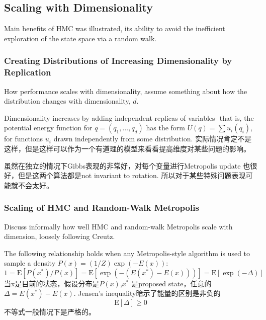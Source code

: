 \documentclass[
]{book}
\theoremstyle{definition}
\theoremstyle{definition}
\theoremstyle{definition}
\theoremstyle{remark}
\begin{document}
\hypertarget{scaling-with-dimensionality}{%
\subsection{Scaling with Dimensionality}\label{scaling-with-dimensionality}}

Main benefits of HMC was illustrated, its ability to avoid the inefficient exploration of the state space via a random walk.

\hypertarget{creating-distributions-of-increasing-dimensionality-by-replication}{%
\subsubsection{Creating Distributions of Increasing Dimensionality by Replication}\label{creating-distributions-of-increasing-dimensionality-by-replication}}

How performance scales with dimensionality, assume something about how the distribution changes with dimensionality, \(d\).

Dimensionality increases by adding independent replicas of variables- that is, the potential energy function for \(q=(q_1,...,q_d)\) has the form \(U(q)=\sum u_i(q_i)\), for functions \(u_i\) drawn independently from some distribution. 实际情况肯定不是这样，但是这样可以作为一个有道理的模型来看看提高维度对某些问题的影响。

虽然在独立的情况下Gibbs表现的非常好，对每个变量进行Metropolis update 也很好，但是这两个算法都是not invariant to rotation. 所以对于某些特殊问题表现可能就不会太好。

\hypertarget{scaling-of-hmc-and-random-walk-metropolis}{%
\subsubsection{Scaling of HMC and Random-Walk Metropolis}\label{scaling-of-hmc-and-random-walk-metropolis}}

Discuss informally how well HMC and random-walk Metropolis scale with dimension, loosely following Creutz.

The following relationship holds when any Metropolis-style algorithm is used to sample a density \(P(x)=(1 / Z) \exp (-E(x))\):
\[
1=\mathrm{E}\left[P\left(x^{*}\right) / P(x)\right]=\mathrm{E}\left[\exp \left(-\left(E\left(x^{*}\right)-E(x)\right)\right)\right]=\mathrm{E}[\exp (-\Delta)]
\]
当x是目前的状态，假设分布是\(P(x)\),\(x^*\) 是proposed state，任意的\(\Delta=E\left(x^{*}\right)-E(x)\). Jensen's inequality暗示了能量的区别是非负的
\[
\mathrm{E}[\Delta] \geq 0
\]
不等式一般情况下是严格的。
\end{document}
